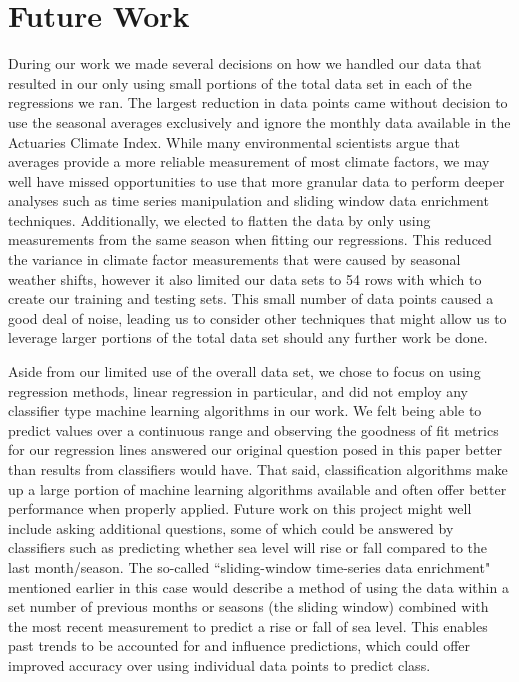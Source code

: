 \documentclass[12pt]{report}
\begin{document}
\section* {Future Work}
\indent \par During our work we made several decisions on how we handled our data that resulted in our only using small portions of the total data set in each of the regressions we ran. The largest reduction in data points came without decision to use the seasonal averages exclusively and ignore the monthly data available in the Actuaries Climate Index. While many environmental scientists argue that averages provide a more reliable measurement of most climate factors, we may well have missed opportunities to use that more granular data to perform deeper analyses such as time series manipulation and sliding window data enrichment techniques. Additionally, we elected to flatten the data by only using measurements from the same season when fitting our regressions. This reduced the variance in climate factor measurements that were caused by seasonal weather shifts, however it also limited our data sets to 54 rows with which to create our training and testing sets. This small number of data points caused a good deal of noise, leading us to consider other techniques that might allow us to leverage larger portions of the total data set should any further work be done.
\par Aside from our limited use of the overall data set, we chose to focus on using regression methods, linear regression in particular, and did not employ any classifier type machine learning algorithms in our work. We felt being able to predict values over a continuous range and observing the goodness of fit metrics for our regression lines answered our original question posed in this paper better than results from classifiers would have. That said, classification algorithms make up a large portion of machine learning algorithms available and often offer better performance when properly applied. Future work on this project might well include asking additional questions, some of which could be answered by classifiers such as predicting whether sea level will rise or fall compared to the last month/season. The so-called \textquotedblleft sliding-window time-series data enrichment" mentioned earlier in this case would describe a method of using the data within a set number of previous months or seasons (the sliding window) combined with the most recent measurement to predict a rise or fall of sea level. This enables past trends to be accounted for and influence predictions, which could offer improved accuracy over using individual data points to predict class.
\end{document}
